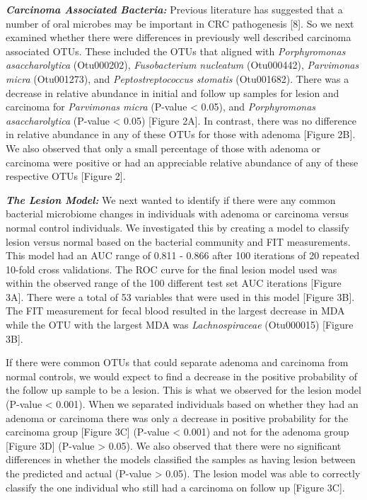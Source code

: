 \documentclass[12pt,]{article}
\begin{document}
\textbf{\emph{Carcinoma Associated Bacteria:}} Previous literature has
suggested that a number of oral microbes may be important in CRC
pathogenesis {[}8{]}. So we next examined whether there were differences
in previously well described carcinoma associated OTUs. These included
the OTUs that aligned with \emph{Porphyromonas asaccharolytica}
(Otu000202), \emph{Fusobacterium nucleatum} (Otu000442),
\emph{Parvimonas micra} (Otu001273), and \emph{Peptostreptococcus
stomatis} (Otu001682). There was a decrease in relative abundance in
initial and follow up samples for lesion and carcinoma for
\emph{Parvimonas micra} (P-value \textless{} 0.05), and
\emph{Porphyromonas asaccharolytica} (P-value \textless{} 0.05)
{[}Figure 2A{]}. In contrast, there was no difference in relative
abundance in any of these OTUs for those with adenoma {[}Figure 2B{]}.
We also observed that only a small percentage of those with adenoma or
carcinoma were positive or had an appreciable relative abundance of any
of these respective OTUs {[}Figure 2{]}.

\textbf{\emph{The Lesion Model:}} We next wanted to identify if there
were any common bacterial microbiome changes in individuals with adenoma
or carcinoma versus normal control individuals. We investigated this by
creating a model to classify lesion versus normal based on the bacterial
community and FIT measurements. This model had an AUC range of 0.811 -
0.866 after 100 iterations of 20 repeated 10-fold cross validations. The
ROC curve for the final lesion model used was within the observed range
of the 100 different test set AUC iterations {[}Figure 3A{]}. There were
a total of 53 variables that were used in this model {[}Figure 3B{]}.
The FIT measurement for fecal blood resulted in the largest decrease in
MDA while the OTU with the largest MDA was \emph{Lachnospiraceae}
(Otu000015) {[}Figure 3B{]}.

If there were common OTUs that could separate adenoma and carcinoma from
normal controls, we would expect to find a decrease in the positive
probability of the follow up sample to be a lesion. This is what we
observed for the lesion model (P-value \textless{} 0.001). When we
separated individuals based on whether they had an adenoma or carcinoma
there was only a decrease in positive probability for the carcinoma
group {[}Figure 3C{]} (P-value \textless{} 0.001) and not for the
adenoma group {[}Figure 3D{]} (P-value \textgreater{} 0.05). We also
observed that there were no significant differences in whether the
models classified the samples as having lesion between the predicted and
actual (P-value \textgreater{} 0.05). The lesion model was able to
correctly classify the one individual who still had a carcinoma on
follow up {[}Figure 3C{]}.
\end{document}
